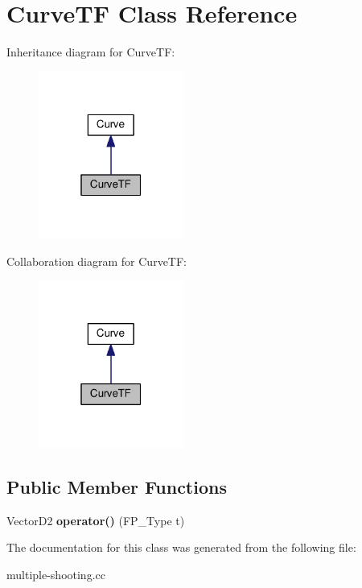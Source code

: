 \hypertarget{classCurveTF}{}\section{Curve\+TF Class Reference}
\label{classCurveTF}


Inheritance diagram for Curve\+TF\+:
\nopagebreak
\begin{figure}[H]
\begin{center}
\leavevmode
\includegraphics[width=135pt]{classCurveTF__inherit__graph}
\end{center}
\end{figure}


Collaboration diagram for Curve\+TF\+:
\nopagebreak
\begin{figure}[H]
\begin{center}
\leavevmode
\includegraphics[width=135pt]{classCurveTF__coll__graph}
\end{center}
\end{figure}
\subsection*{Public Member Functions}
\begin{DoxyCompactItemize}
\item 
\mbox{\label{classCurveTF_a240e9a0f02f6a42a13dcecb1a35a7756}} 
Vector\+D2 {\bfseries operator()} (F\+P\+\_\+\+Type t)
\end{DoxyCompactItemize}


The documentation for this class was generated from the following file\+:\begin{DoxyCompactItemize}
\item 
multiple-\/shooting.\+cc\end{DoxyCompactItemize}
